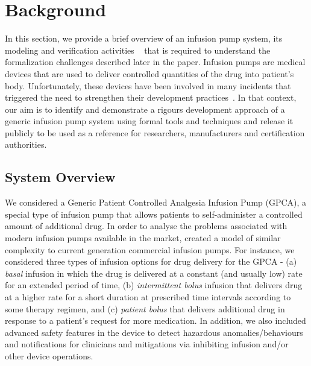 \vspace{-0.1in}\section{Background}
\label{sec:gpca-overview}
\vspace{-0.05in}
In this section, we provide a brief overview of an infusion pump system, its modeling and verification activities ~\cite{hilt2013, req2code} that is required to understand the formalization challenges described later in the paper. Infusion pumps are medical devices that are used to deliver controlled quantities of the drug into patient's body. Unfortunately, these devices have been involved in many incidents that triggered the need to strengthen their development practices~\cite{fda2010whitepaper}. In that context, our aim is to identify and demonstrate a rigours development approach of a generic infusion pump system using formal tools and techniques and release it publicly to be used as a reference for researchers, manufacturers and certification authorities.
\vspace{-0.05in}
\subsection {System Overview}
\vspace{-0.05in}
We considered a Generic Patient Controlled Analgesia Infusion Pump (GPCA), a special type of infusion pump that allows patients to self-administer a controlled amount of additional drug. %
In order to analyse the problems associated with modern infusion pumps available in the market, created a model of similar complexity to current generation commercial infusion pumps. For instance, we considered three types of infusion options for drug delivery for the GPCA - (a) \emph{basal} infusion in which the drug is delivered at a constant (and usually low) rate for an extended period of
time, (b) \emph{intermittent bolus} infusion that delivers drug at a higher rate for a short duration at prescribed time intervals according to some therapy regimen, and (c) \emph{patient bolus} that delivers additional drug in response to a patient's request for more medication. In addition, we also included advanced safety features in the device to detect hazardous anomalies/behaviours and notifications for clinicians and mitigations via inhibiting infusion and/or other device operations.

